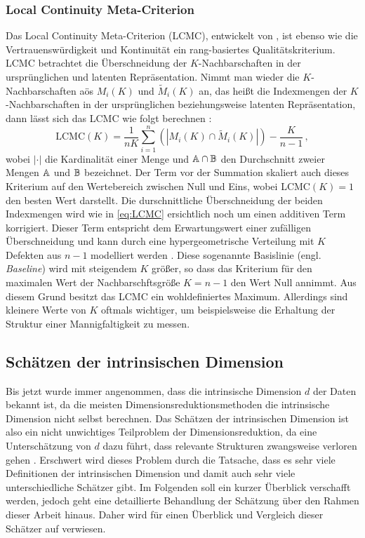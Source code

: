\subsubsection{Local Continuity Meta-Criterion}
\label{ch:Vergleich:sec:Methodik:subsec:Qualitaetskriterien:LCMC}
Das Local Continuity Meta-Criterion (LCMC), entwickelt von \textcite{Chen.2009}, ist ebenso wie die Vertrauenswürdigkeit und Kontinuität ein rang-basiertes Qualitätskriterium. LCMC betrachtet die Überschneidung der $K$-Nachbarschaften in der ursprünglichen und latenten Repräsentation. Nimmt man wieder die $K$-Nachbarschaften aös $M_i(K)$ und $\widetilde{M}_i(K)$ an, das heißt die Indexmengen der $K$-Nachbarschaften in der ursprünglichen beziehungsweise latenten Repräsentation, dann lässt sich das LCMC wie folgt berechnen \parencite[212]{Chen.2009}:
\begin{equation}
	\label{eq:LCMC}
	\text{LCMC}(K) = \frac{1}{nK} \sum_{i=1}^{n} \left( \left| M_i(K) \cap \widetilde{M}_i(K) \right| \right) - \frac{K}{n - 1} \,,
\end{equation}
wobei $­|\cdot|$ die Kardinalität einer Menge und $\mathbb{A} \cap \mathbb{B}$ den Durchschnitt zweier Mengen $\mathbb{A}$ und $\mathbb{B}$ bezeichnet. Der Term vor der Summation skaliert auch dieses Kriterium auf den Wertebereich zwischen Null und Eins, wobei LCMC$(K) = 1$ den besten Wert darstellt. Die durschnittliche Überschneidung der beiden Indexmengen wird wie in \eqref{eq:LCMC} ersichtlich noch um einen additiven Term korrigiert. Dieser Term entspricht dem Erwartungswert einer zufälligen Überschneidung und kann durch eine hypergeometrische Verteilung mit $K$ Defekten aus $n - 1$ modelliert werden \parencite[213]{Chen.2009}. Diese sogenannte Basislinie (engl. \textit{Baseline}) wird mit steigendem
$K$ größer, so dass das Kriterium für den maximalen Wert der Nachbarschftsgröße $K = n - 1$ den
Wert Null annimmt. Aus diesem Grund besitzt das LCMC ein wohldefiniertes Maximum. Allerdings sind
kleinere Werte von $K$ oftmals wichtiger, um beispielsweise die Erhaltung der Struktur einer
Mannigfaltigkeit zu messen.

\subsection{Schätzen der intrinsischen Dimension}
\label{ch:Vergleich:sec:Methodik:subsec:SchaetzenDerIntrinsischenDim}

Bis jetzt wurde immer angenommen, dass die intrinsische Dimension $d$ der Daten bekannt ist, da die
meisten Dimensionsreduktionsmethoden die intrinsische Dimension nicht selbst berechnen. Das
Schätzen der intrinsischen Dimension ist also ein nicht unwichtiges Teilproblem der
Dimensionsreduktion, da eine Unterschätzung von $d$ dazu führt, dass relevante Strukturen
zwangsweise verloren gehen \parencite[1]{Levina.2004}. Erschwert wird dieses Problem durch die Tatsache, dass es sehr viele
Definitionen der intrinsischen Dimension und damit auch sehr viele unterschiedliche Schätzer gibt.
Im Folgenden soll ein kurzer Überblick verschafft werden, jedoch geht eine detaillierte Behandlung
der Schätzung über den Rahmen dieser Arbeit hinaus. Daher wird für einen Überblick und Vergleich
dieser Schätzer auf \textcites{Campadelli.2015}{Bac.2021}{Verveer.1995} verwiesen.

